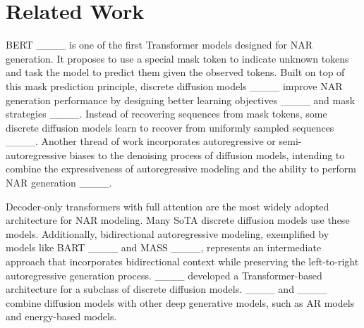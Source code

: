 \section{Related Work}
BERT ____ is one of the first Transformer models designed for NAR generation. It proposes to use a special mask token to indicate unknown tokens and task the model to predict them given the observed tokens. Built on top of this mask prediction principle, discrete diffusion models ____ improve NAR generation performance by designing better learning objectives ____ and mask strategies ____. Instead of recovering sequences from mask tokens, some discrete diffusion models learn to recover from uniformly sampled sequences ____. Another thread of work incorporates autoregressive or semi-autoregressive biases to the denoising process of diffusion models, intending to combine the expressiveness of autoregressive modeling and the ability to perform NAR generation ____.

Decoder-only transformers with full attention are the most widely adopted architecture for NAR modeling. Many SoTA discrete diffusion models use these models. Additionally, bidirectional autoregressive modeling, exemplified by models like BART ____ and MASS ____, represents an intermediate approach that incorporates bidirectional context while preserving the left-to-right autoregressive generation process. ____ developed a Transformer-based architecture for a subclass of discrete diffusion models. ____ and ____ combine diffusion models with other deep generative models, such as AR models and energy-based models.